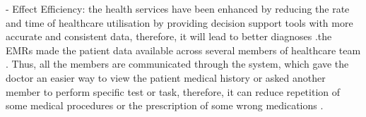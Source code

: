- Effect Efficiency: the health services  have been enhanced by reducing the rate and time of healthcare utilisation by providing decision support tools with more accurate and consistent data, therefore, it will lead to better diagnoses \cite{chaudhry2006systematic}.the EMRs made the patient data available across several members of healthcare team . Thus, all the members are communicated through the system, which gave the doctor an easier way to view the patient medical history or asked another member to perform specific test or task, therefore, it can reduce repetition of some medical procedures or the prescription of some wrong medications \cite{OfHealth}. 











